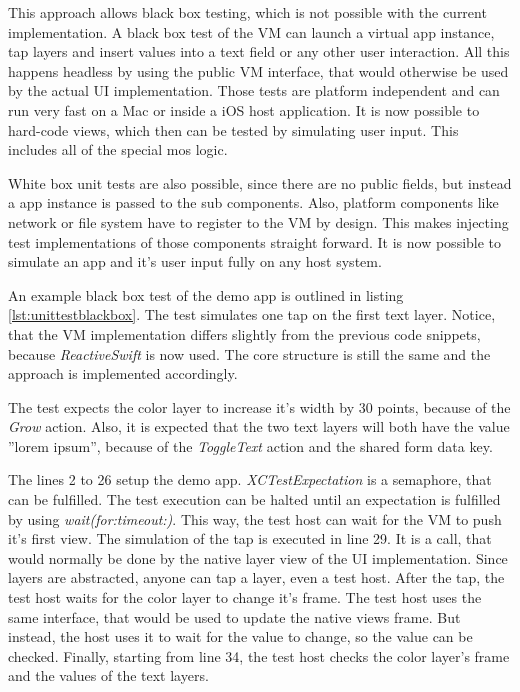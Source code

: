This approach allows black box testing, which is not possible with the current implementation.
A black box test of the \ac{VM} can launch a virtual app instance, tap layers and insert values into a text field or any other user interaction.
All this happens headless by using the public \ac{VM} interface, that would otherwise be used by the actual \ac{UI} implementation.
Those tests are platform independent and can run very fast on a Mac or inside a iOS host application.
It is now possible to hard-code views, which then can be tested by simulating user input.
This includes all of the special mos logic.

White box unit tests are also possible, since there are no public fields, but instead a app instance is passed to the sub components.
Also, platform components like network or file system have to register to the \ac{VM} by design.
This makes injecting test implementations of those components straight forward.
It is now possible to simulate an app and it's user input fully on any host system.

An example black box test of the demo app is outlined in listing \ref{lst:unittestblackbox}.
The test simulates one tap on the first text layer.
Notice, that the \ac{VM} implementation differs slightly from the previous code snippets, because \textit{ReactiveSwift} is now used.
The core structure is still the same and the approach is implemented accordingly.

The test expects the color layer to increase it's width by 30 points, because of the \textit{Grow} action.
Also, it is expected that the two text layers will both have the value ''lorem ipsum'', because of the \textit{ToggleText} action and the shared form data key.

The lines 2 to 26 setup the demo app.
\textit{XCTestExpectation} is a semaphore, that can be fulfilled.
The test execution can be halted until an expectation is fulfilled by using \textit{wait(for:timeout:)}.
This way, the test host can wait for the \ac{VM} to push it's first view.
The simulation of the tap is executed in line 29.
It is a call, that would normally be done by the native layer view of the \ac{UI} implementation.
Since layers are abstracted, anyone can tap a layer, even a test host.
After the tap, the test host waits for the color layer to change it's frame.
The test host uses the same interface, that would be used to update the native views frame.
But instead, the host uses it to wait for the value to change, so the value can be checked.
Finally, starting from line 34, the test host checks the color layer's frame and the values of the text layers.

